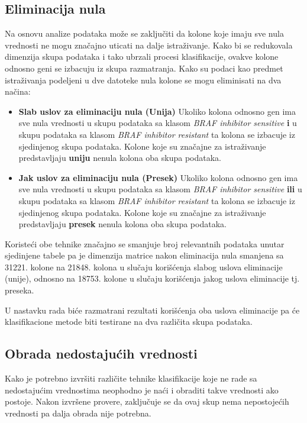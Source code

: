 \documentclass[a4paper]{article}
\begin{document}
\subsection{Eliminacija nula}
\label{elnula}

Na osnovu analize podataka može se zaključiti da kolone koje imaju sve nula vrednosti ne mogu značajno uticati na dalje istraživanje. Kako bi se redukovala dimenzija skupa podataka i tako ubrzali procesi klasifikacije, ovakve kolone odnosno geni se izbacuju iz skupa razmatranja. Kako su podaci kao predmet istraživanja podeljeni u dve datoteke nula kolone se mogu eliminisati na dva načina:

\begin{itemize}
  \item \textbf{Slab uslov za eliminaciju nula (Unija)} \newline
    Ukoliko kolona odnosno gen ima sve nula vrednosti u skupu podataka sa klasom \textit{BRAF inhibitor sensitive} \textbf{i} u skupu podataka sa klasom \textit{ BRAF inhibitor resistant} ta kolona se izbacuje iz sjedinjenog skupa podataka. Kolone koje su značajne za istraživanje predstavljaju \textbf{uniju} nenula kolona oba skupa podataka.
  \item \textbf{Jak uslov za eliminaciju nula (Presek)} \newline
    Ukoliko kolona odnosno gen ima sve nula vrednosti u skupu podataka sa klasom \textit{BRAF inhibitor sensitive} \textbf{ili} u skupu podataka sa klasom \textit{ BRAF inhibitor resistant} ta kolona se izbacuje iz sjedinjenog skupa podataka. Kolone koje su značajne za istraživanje predstavljaju \textbf{presek} nenula kolona oba skupa podataka.
\end{itemize}

Koristeći obe tehnike značajno se smanjuje broj relevantnih podataka unutar sjedinjene tabele pa je dimenzija matrice nakon eliminacija nula smanjena sa 31221. kolone na 21848. kolona u slučaju korišćenja slabog uslova eliminacije (unije), odnosno na 18753. kolone u slučaju korišćenja jakog uslova eliminacije tj. preseka. 

U nastavku rada biće razmatrani rezultati korišćenja oba uslova eliminacije pa će klasifikacione metode biti testirane na dva različita skupa podataka.

\subsection{Obrada nedostajućih vrednosti}
Kako je potrebno izvršiti različite tehnike klasifikacije koje ne rade sa nedostajućim vrednostima neophodno je naći i obraditi takve vrednosti ako postoje. Nakon izvršene provere, zaključuje se da ovaj skup nema nepostojećih vrednosti pa dalja obrada nije potrebna.
\end{document}
